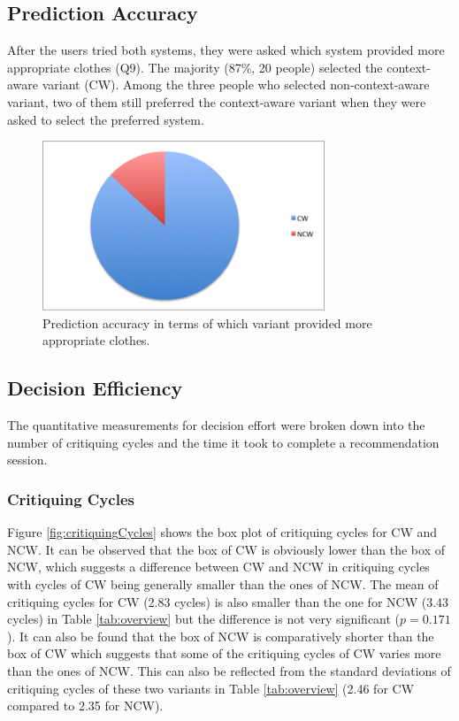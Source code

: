 \subsection{Prediction Accuracy} \label{sec:results_pa}

After the users tried both systems, they were asked which system provided more appropriate clothes (Q9). The majority (87\%, 20 people) selected the context-aware variant (CW). Among the three people who selected non-context-aware variant, two of them still preferred the context-aware variant when they were asked to select the preferred system.

\begin{figure}[H]
	\centering
	\includegraphics[height=2in]{figures/predictionAccuracy.png}
	\caption{Prediction accuracy in terms of which variant provided more appropriate clothes.}
	\label{fig:predictionAccuracy}
\end{figure}

\subsection{Decision Efficiency} \label{sec:results_de}

The quantitative measurements for decision effort were broken down into the number of critiquing cycles and the time it took to complete a recommendation session.

\subsubsection{Critiquing Cycles} \label{sec:results_de_cc}

Figure \ref{fig:critiquingCycles} shows the box plot of critiquing cycles for CW and NCW. It can be observed that the box of CW is obviously lower than the box of NCW, which suggests a difference between CW and NCW in critiquing cycles with cycles of CW being generally smaller than the ones of NCW. The mean of critiquing cycles for CW (2.83 cycles) is also smaller than the one for NCW (3.43 cycles) in Table \ref{tab:overview} but the difference is not very significant ($p=0.171$). It can also be found that the box of NCW is comparatively shorter than the box of CW which suggests that some of the critiquing cycles of CW varies more than the ones of NCW. This can also be reflected from the standard deviations of critiquing cycles of these two variants in Table \ref{tab:overview} (2.46 for CW compared to 2.35 for NCW).

